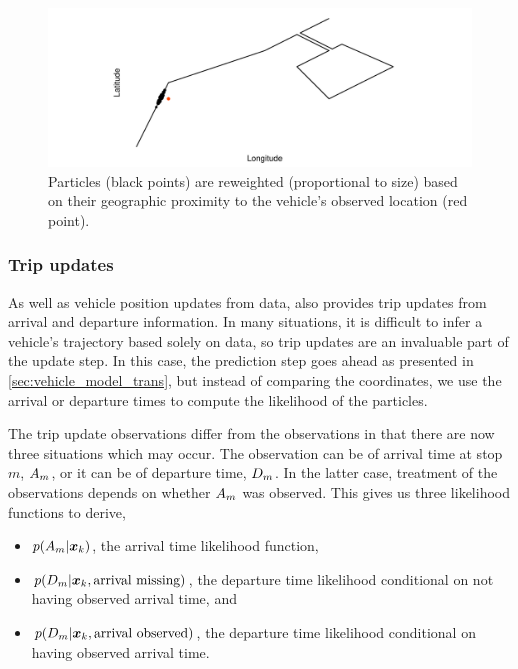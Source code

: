\begin{knitrout}\small
{}\color{fgcolor}\begin{figure}

{\centering \includegraphics[width=\maxwidth]{figure/pf_wts-1} 

}

\caption[Particles are reweighted based on their geographic proximity to the vehicle's observed location]{Particles (black points) are reweighted (proportional to size) based on their geographic proximity to the vehicle's observed location (red point).}\label{fig:pf_wts}
\end{figure}


\end{knitrout}


\subsubsection{Trip updates}
\label{sec:lhood_trip}

As well as vehicle position updates from \GPS{} data, \GTFS{} also provides trip updates from arrival and departure information. In many situations, it is difficult to infer a vehicle's trajectory based solely on \GPS{} data, so trip updates are an invaluable part of the update step. In this case, the \pf{} prediction step goes ahead as presented in \cref{sec:vehicle_model_trans}, but instead of comparing the coordinates, we use the arrival or departure times to compute the likelihood of the particles.


The trip update observations differ from the \GPS{} observations in that there are now three situations which may occur. The observation can be of arrival time at stop $m$, $A_m$, or it can be of departure time, $D_m$. In the latter case, treatment of the observations depends on whether $A_m$ was observed. This gives us three likelihood functions to derive,
\begin{itemize}
\item $p(A_m | \boldsymbol x_k)$, the arrival time likelihood function,
\item $p(D_m | \boldsymbol x_k, \text{arrival missing})$, the departure time likelihood conditional on not having observed arrival time, and
\item $p(D_m | \boldsymbol x_k, \text{arrival observed})$, the departure time likelihood conditional on having observed arrival time.
\end{itemize}


